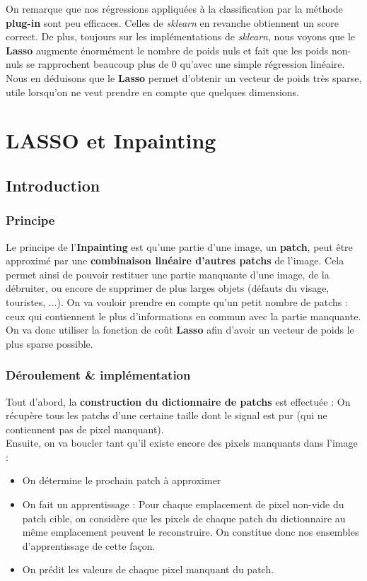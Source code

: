 \documentclass[a4paper]{memoir}
\begin{document}
On remarque que nos régressions appliquées à la classification par la méthode \textbf{plug-in} sont peu efficaces. Celles de \textit{sklearn} en revanche obtiennent un score correct. De plus, toujours sur les implémentations de \textit{sklearn}, nous voyons que le \textbf{Lasso} augmente énormément le nombre de poids nuls et fait que les poids non-nuls se rapprochent beaucoup plus de $0$ qu'avec une simple régression linéaire. Nous en déduisons que le \textbf{Lasso} permet d'obtenir un vecteur de poids très sparse, utile lorsqu'on ne veut prendre en compte que quelques dimensions.


\section{LASSO et Inpainting}
\subsection{Introduction}
\subsubsection{Principe}
Le principe de l'\textbf{Inpainting} est qu'une partie d'une image, un \textbf{patch}, peut être approximé par une \textbf{combinaison linéaire d'autres patchs} de l'image. Cela permet ainsi de pouvoir restituer une partie manquante d'une image, de la débruiter, ou encore de supprimer de plus larges objets (défauts du visage, touristes, $\ldots$). On va vouloir prendre en compte qu'un petit nombre de patchs : ceux qui contiennent le plus d'informations en commun avec la partie manquante. On va donc utiliser la fonction de coût \textbf{Lasso} afin d'avoir un vecteur de poids le plus sparse possible.


\subsubsection{Déroulement \& implémentation}
Tout d'abord, la \textbf{construction du dictionnaire de patchs} est effectuée : On récupère tous les patchs d'une certaine taille dont le signal est pur (qui ne contiennent pas de pixel manquant).\\
Ensuite, on va boucler tant qu'il existe encore des pixels manquants dans l'image :
\begin{itemize}
\item On détermine le prochain patch à approximer
\item On fait un apprentissage : Pour chaque emplacement de pixel non-vide du patch cible, on considère que les pixels de chaque patch du dictionnaire au même emplacement peuvent le reconstruire. On constitue donc nos ensembles d'apprentissage de cette façon.
\item On prédit les valeurs de chaque pixel manquant du patch. 
\end{itemize}
\end{document}
